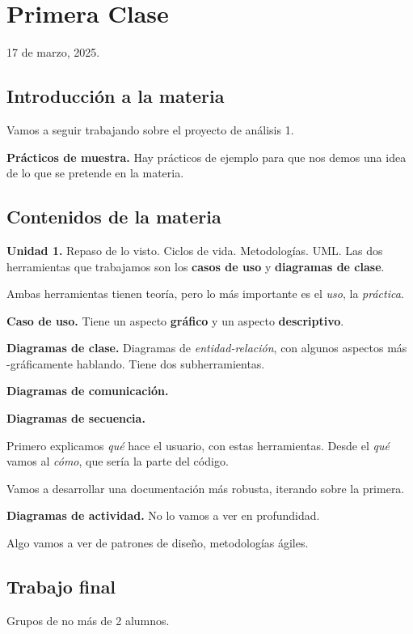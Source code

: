 \section{Primera Clase}

17 de marzo, 2025.

\subsection{Introducción a la materia}

Vamos a seguir trabajando sobre el proyecto de análisis 1.

\textbf{Prácticos de muestra.}
Hay prácticos de ejemplo para que nos demos una idea de lo que se pretende en la materia.

\subsection{Contenidos de la materia}

\textbf{Unidad 1.}
Repaso de lo visto. Ciclos de vida. Metodologías.
UML. 
Las dos herramientas que trabajamos son los \textbf{casos de uso} y \textbf{diagramas de clase}.

Ambas herramientas tienen teoría, pero lo más importante es el \textit{uso}, la \textit{práctica}.

\textbf{Caso de uso.}
Tiene un aspecto \textbf{gráfico} y un aspecto \textbf{descriptivo}.

\textbf{Diagramas de clase.}
Diagramas de \textit{entidad-relación},
con algunos aspectos más -gráficamente hablando.
Tiene dos subherramientas.

\textbf{Diagramas de comunicación.}

\textbf{Diagramas de secuencia.}

Primero explicamos \textit{qué} hace el usuario,
con estas herramientas.
Desde el \textit{qué} vamos al \textit{cómo},
que sería la parte del código.

Vamos a desarrollar una documentación más robusta,
iterando sobre la primera.

\textbf{Diagramas de actividad.}
No lo vamos a ver en profundidad.

Algo vamos a ver de patrones de diseño,
metodologías ágiles.

\subsection{Trabajo final}

Grupos de no más de 2 alumnos.

